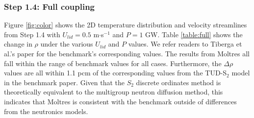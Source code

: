 \subsubsection{Step 1.4: Full coupling}

Figure \ref{fig:color} shows the 2D temperature distribution and velocity
streamlines from Step 1.4 with $U_{lid} = 0.5$ m$\cdot$s$^{-1}$ and $P = 1$ GW.
Table \ref{table:full} shows the change in $\rho$ under the various $U_{lid}$
and $P$ values. We refer readers to Tiberga et al.'s paper
\citep{tiberga_results_2020} for the benchmark's corresponding values.
The results from Moltres all fall within the range of benchmark values for all
cases. Furthermore, the $\Delta\rho$ values are all within 1.1 pcm of the
corresponding values from the TUD-S$_2$ model in the benchmark paper. Given
that the $S_2$ discrete ordinates method is theoretically equivalent to the
multigroup neutron diffusion method, this indicates that Moltres is
consistent with the benchmark outside of differences from the neutronics
models.

